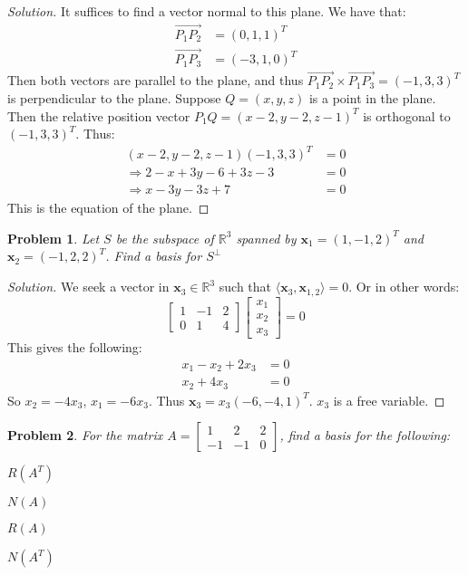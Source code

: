 \documentclass{article}
\theoremstyle{mystyle}
\newtheorem{problem}{Problem}[section]
\begin{document}
\begin{proof}[Solution]
It suffices to find a vector normal to this plane. We have that:
\begin{align*}
    \overrightarrow{P_1P_2} &= (0,1,1)^T\\
    \overrightarrow{P_1P_3} &= (-3,1,0)^T
\end{align*}
Then both vectors are parallel to the plane, and thus $\overrightarrow{P_1P_2}\times \overrightarrow{P_1P_3}=(-1,3,3)^T$ is perpendicular to the plane. Suppose $Q=(x,y,z)$ is a point in the plane. Then the relative position vector $P_1 Q = (x-2,y-2,z-1)^T$ is orthogonal to $(-1,3,3)^T$. Thus:
\begin{align*}
    (x-2,y-2,z-1)(-1,3,3)^T &= 0\\
    \Rightarrow 2-x+3y-6+3z-3 &= 0\\
    \Rightarrow x-3y-3z +7 &= 0   
\end{align*}
This is the equation of the plane.
\end{proof}
\begin{problem}
Let $S$ be the subspace of $\mathbb{R}^3$ spanned by $\mathbf{x}_1 = (1,-1,2)^T$ and $\mathbf{x}_2 = (-1,2,2)^T$. Find a basis for $S^{\perp}$
\end{problem}
\begin{proof}[Solution]
We seek a vector in $\mathbf{x}_3\in\mathbb{R}^3$ such that $\langle \mathbf{x}_3, \mathbf{x}_{1,2}\rangle = 0$. Or in other words:
\begin{equation*}
    \begin{bmatrix} 1 & -1 & 2 \\ 0 & 1 & 4 \end{bmatrix} \begin{bmatrix} x_1 \\ x_2 \\ x_3 \end{bmatrix} = 0    
\end{equation*}
This gives the following:
\begin{align*}
x_1 - x_2 + 2x_3 &= 0\\
	x_2 + 4x_3 &= 0
\end{align*}
So $x_2 = -4x_3$, $x_1=-6x_3$. Thus $\mathbf{x}_3 = x_3(-6,-4,1)^T$. $x_3$ is a free variable.
\end{proof}
\begin{problem}
For the matrix $A = \begin{bmatrix} 1 & 2 & 2 \\ -1 & -1 & 0 \end{bmatrix}$, find a basis for the following:
\begin{enumerate}
\begin{multicols}{4}
    \item $R(A^T)$
    \item $N(A)$
    \item $R(A)$
    \item $N(A^T)$
\end{multicols}
\end{enumerate}
\end{problem}
\end{document}
